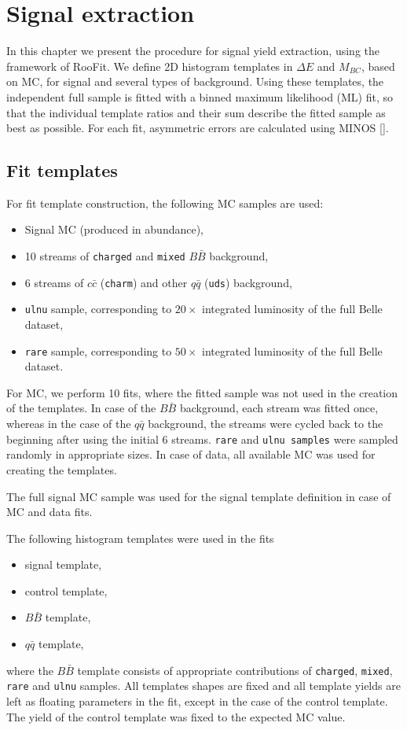\documentclass[  headings=standardclasses,
  headings=big,oneside,a4paper,openany,12pt]{scrbook}
\begin{document}
\chapter{Signal extraction}
In this chapter we present the procedure for signal yield extraction, using the framework of RooFit. We define 2D histogram templates in $\Delta E$ and $M_{BC}$, based on MC, for signal and several types of background. Using these templates, the independent full sample is fitted with a binned maximum likelihood (ML) fit, so that the individual template ratios and their sum describe the fitted sample as best as possible. For each fit, asymmetric errors are calculated using MINOS [].



\section{Fit templates}

For fit template construction, the following MC samples are used:
\begin{itemize}
\item Signal MC (produced in abundance),
\item 10 streams of \texttt{charged} and \texttt{mixed} $B \bar B$ background,
\item 6 streams of $c \bar c$ (\texttt{charm}) and other $q \bar q$ (\texttt{uds}) background,
\item \texttt{ulnu} sample, corresponding to $20\times$ integrated luminosity of the full Belle dataset,
\item \texttt{rare} sample, corresponding to $50\times$ integrated luminosity of the full Belle dataset.
\end{itemize}

For MC, we perform 10 fits, where the fitted sample was not used in the creation of the templates. In case of the $B\bar B$ background, each stream was fitted once, whereas in the case of the $q\bar q$ background, the streams were cycled back to the beginning after using the initial 6 streams. \texttt{rare} and \texttt{ulnu samples} were sampled randomly in appropriate sizes. In case of data, all available MC was used for creating the templates.

The full signal MC sample was used for the signal template definition in case of MC and data fits.

The following histogram templates were used in the fits
\begin{itemize}
\item signal template,
\item control template,
\item $B \bar B$ template,
\item $q \bar q$ template,
\end{itemize}
where the $B \bar B$ template consists of appropriate contributions of \texttt{charged}, \texttt{mixed}, \texttt{rare} and \texttt{ulnu} samples. All templates shapes are fixed and all template yields are left as floating parameters in the fit, except in the case of the control template. The yield of the control template was fixed to the expected MC value.
\end{document}
